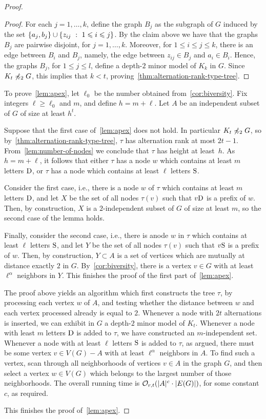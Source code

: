 \begin{proof}
\begin{proof}
For each $j=1,\ldots,k$, define the graph $B_j$
as the subgraph of $G$ induced by the set
$\{a_j,b_j\}\cup\{z_{ij}~:~ 1\leqslant i\leqslant  j\}$.
By the claim above we have that the graphs $B_j$
are pairwise disjoint, for $j=1,\ldots,k$.
Moreover, for $1\le i\le j\le k$, there is an edge between $B_i$
and $B_j$, namely, the edge between $z_{ij}\in B_j$
and $a_i\in B_i$.
Hence, the graphs $B_j$, for $1\le j\le l$, define a depth-$2$ minor model of $K_k$ in $G$. Since $K_t\not\preccurlyeq_{2}G$, this implies that $k<t$, proving~\cref{thm:alternation-rank-type-tree}.
\end{proof}

To prove~\cref{lem:apex}, let $\ell_0$
be the number obtained from~\cref{cor:biversity}.
Fix integers $\ell\ge \ell_0$ and $m$, and define $h=m+\ell$.
Let $A$ be an independent subset of $G$
of size at least $h^{t}$.

Suppose that the first case of~\cref{lem:apex} does not hold. In particular $K_t\not\preccurlyeq_2 G$, so by~\cref{thm:alternation-rank-type-tree}, $\tau$ has alternation rank at most $2t-1$. From~\cref{lem:number-of-nodes} 
we conclude that $\tau$  has height at least~$h$.
As $h=m+\ell$, it follows that either $\tau$  has a node $w$ which contains at least $m$ letters $\mathrm{D}$, or $\tau$ has a node which contains  at least $\ell$ letters $\mathrm{S}$.

Consider the first case, i.e., there is a node $w$ of $\tau$
which contains at least $m$ letters $\mathrm{D}$, and let $X$
be the set of all nodes $\tau(v)$ such that $v\mathrm{D}$ is a prefix of $w$. Then, by construction, $X$ is a $2$-independent subset of $G$ of size at least $m$, so the second case of the lemma holds.

Finally, consider the second case, i.e., there is anode $w$ in $\tau$ which contains at least $\ell$ letters $\mathrm{S}$, and let 
$Y$ be the set of all nodes $\tau(v)$ such that $v\mathrm{S}$ is a prefix of $w$. Then, by construction, $Y\subset A$ is a set of vertices which are mutually at distance exactly $2$ in $G$. By~\cref{cor:biversity}, there is a vertex $v\in G$
with at least $\ell^{\alpha}$ neighbors in $Y$.
This finishes the proof of the first part of~\cref{lem:apex}.

\medskip
The proof above yields an algorithm which first constructs the tree $\tau$, by 
processing each vertex $w$ of $A$, and testing whether the distance between $w$ and each vertex processed already is equal to $2$. Whenever a node with $2t$ alternations 
is inserted, we can exhibit in $G$ a depth-$2$ minor model of $K_t$.
Whenever a node with least $m$ letters $\mathrm{D}$ is added to $\tau$,
we have constructed an $m$-independent set. Whenever a node with at least $\ell$ letters $\mathrm{S}$ is added to $\tau$, as argued, there must be some vertex $v\in V(G)-A$ with at least $\ell^\alpha$ neighbors in $A$. To find such a vertex, scan through all neighborhoods of vertices $v\in A$ in the graph $G$, and then select a vertex $w\in V(G)$
which belongs to the largest number of those neighborhoods. The overall running time is 
$\mathcal{O}_{r,t}(|A|^c\cdot |E(G)|)$, for some constant $c$, as required.

\medskip
This finishes the proof of~\cref{lem:apex}.
\end{proof}

